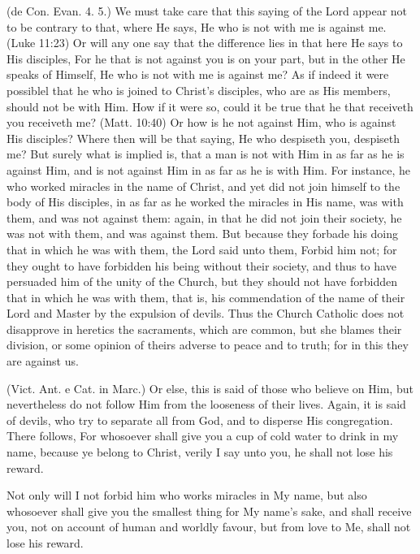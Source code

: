  (de Con. Evan. 4. 5.) We must take care that this saying of the Lord appear not to be contrary to that, where He says, He who is not with me is against me. (Luke 11:23) Or will any one say that the difference lies in that here He says to His disciples, For he that is not against you is on your part, but in the other He speaks of Himself, He who is not with me is against me? As if indeed it were possiblel that he who is joined to Christ’s disciples, who are as His members, should not be with Him. How if it were so, could it be true that he that receiveth you receiveth me? (Matt. 10:40) Or how is he not against Him, who is against His disciples? Where then will be that saying, He who despiseth you, despiseth me? But surely what is implied is, that a man is not with Him in as far as he is against Him, and is not against Him in as far as he is with Him. For instance, he who worked miracles in the name of Christ, and yet did not join himself to the body of His disciples, in as far as he worked the miracles in His name, was with them, and was not against them: again, in that he did not join their society, he was not with them, and was against them. But because they forbade his doing that in which he was with them, the Lord said unto them, Forbid him not; for they ought to have forbidden his being without their society, and thus to have persuaded him of the unity of the Church, but they should not have forbidden that in which he was with them, that is, his commendation of the name of their Lord and Master by the expulsion of devils. Thus the Church Catholic does not disapprove in heretics the sacraments, which are common, but she blames their division, or some opinion of theirs adverse to peace and to truth; for in this they are against us.

 (Vict. Ant. e Cat. in Marc.) Or else, this is said of those who believe on Him, but nevertheless do not follow Him from the looseness of their lives. Again, it is said of devils, who try to separate all from God, and to disperse His congregation. There follows, For whosoever shall give you a cup of cold water to drink in my name, because ye belong to Christ, verily I say unto you, he shall not lose his reward.

 Not only will I not forbid him who works miracles in My name, but also whosoever shall give you the smallest thing for My name’s sake, and shall receive you, not on account of human and worldly favour, but from love to Me, shall not lose his reward.

